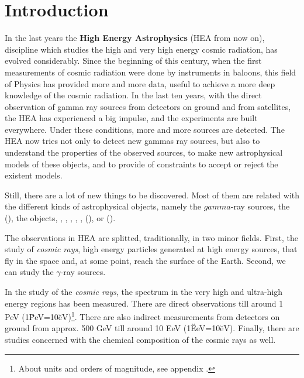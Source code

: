 %

\chapter*{Introduction}
\label{chapter:intro}
\renewcommand{\headname}{Introduction}
%
In the last years the {\bfseries High Energy Astrophysics} (HEA from
now on), discipline which studies the high and very high energy cosmic
radiation, has evolved considerably.  Since the beginning of this
century, when the first measurements of cosmic radiation were done by
instruments in baloons, this field of Physics has provided more and
more data, useful to achieve a more deep knowledge of the cosmic
radiation. In the last ten years, with the direct observation of gamma
ray sources from detectors on ground and from satellites, the HEA has
experienced a big impulse, and the experiments are built
everywhere. Under these conditions, more and more sources are
detected. The HEA now tries not only to detect new gammas ray sources,
but also to understand the properties of the observed sources, to make
new astrophysical models of these objects, and to provide of
constraints to accept or reject the existent models.

Still, there are a lot of new things to be discovered. Most of them
are related with the different kinds of astrophysical objects, namely
the $gamma$-ray sources, the
 (), the
 objects, , ,
, , ,  (), or  ().

The observations in HEA are splitted, traditionally, in two minor
fields. First, the study of {\itshape cosmic rays}, high energy
particles generated at high energy sources, that fly in the space and,
at some point, reach the surface of the Earth. Second, we can study
the $\gamma$-ray sources.

In the study of the {\itshape cosmic rays}, the spectrum in the very
high and ultra-high energy regions has been measured. There are direct
observations till around 1 PeV
(1\u{PeV}=10\u{eV})\footnote{About units and orders of
  magnitude, see appendix .}. There are also
indirect measurements from detectors on ground from approx. 500 GeV
till around 10 EeV (1\u{EeV}=10\u{eV}). Finally, there are
studies concerned with the chemical composition of the cosmic rays as
well.

